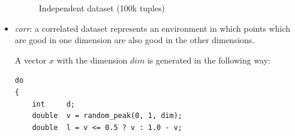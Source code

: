 \begin{itemize}
\begin{figure}[htbp]
\centering
{}%
%
%
\caption{Independent dataset (100k tuples)}%
\label{fig:density-2d-i2d1e5}%
\end{figure}

\vfill
\pagebreak[4]

\item \emph{corr}: 
a correlated dataset represents an environment in which points which
are good in one dimension are also good in the other dimensions. 


A vector $x$ with the dimension $dim$ is generated in the following way:

\medskip
\begin{lstlisting}
do
{
	int		d;
	double	v = random_peak(0, 1, dim);
	double	l = v <= 0.5 ? v : 1.0 - v;
	

\end{lstlisting}
\end{itemize}
